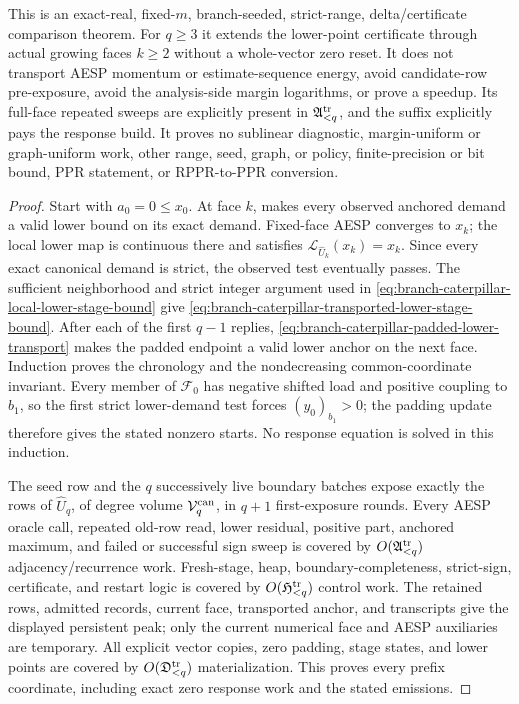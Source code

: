 \begin{theorem}
This is an exact-real, fixed-$m$, branch-seeded, strict-range,
delta/certificate comparison theorem.  For $q\geq3$ it extends the
lower-point certificate through actual growing faces $k\geq2$ without a
whole-vector zero reset.  It does not transport AESP momentum or
estimate-sequence energy, avoid candidate-row pre-exposure, avoid the
analysis-side margin logarithms, or prove a speedup.  Its full-face repeated
sweeps are explicitly present in $\mathfrak A_{<q}^{\rm tr}$, and the suffix
explicitly pays the response build.  It proves no sublinear diagnostic,
margin-uniform or graph-uniform work, other range, seed, graph, or policy,
finite-precision or bit bound, PPR statement, or RPPR-to-PPR conversion.
\end{theorem}

\begin{proof}
Start with $a_0=0\leq x_0$.  At face $k$,
 makes every observed
anchored demand a valid lower bound on its exact demand.  Fixed-face AESP
converges to $x_k$; the local lower map is continuous there and satisfies
$\mathcal L_{\widehat U_k}(x_k)=x_k$.  Since every exact canonical demand is
strict, the observed test eventually passes.  The sufficient neighborhood
and strict integer argument used in
\cref{eq:branch-caterpillar-local-lower-stage-bound} give
\cref{eq:branch-caterpillar-transported-lower-stage-bound}.  After each of the
first $q-1$ replies,
\cref{eq:branch-caterpillar-padded-lower-transport} makes the padded endpoint
a valid lower anchor on the next face.  Induction proves the chronology and
the nondecreasing common-coordinate invariant.  Every member of
$\mathcal F_0$ has negative shifted load and positive coupling to $b_1$, so
the first strict lower-demand test forces $(y_0)_{b_1}>0$; the padding update
therefore gives the stated nonzero starts.  No response equation is solved in
this induction.

The seed row and the $q$ successively live boundary batches expose exactly
the rows of $\widehat U_q$, of degree volume
$\mathcal V_q^{\rm can}$, in $q+1$ first-exposure rounds.  Every AESP
oracle call, repeated old-row read, lower residual, positive part, anchored
maximum, and failed or successful sign sweep is covered by
$O(\mathfrak A_{<q}^{\rm tr})$ adjacency/recurrence work.  Fresh-stage,
heap, boundary-completeness, strict-sign, certificate, and restart logic is
covered by $O(\mathfrak H_{<q}^{\rm tr})$ control work.  The retained rows,
admitted records, current face, transported anchor, and transcripts give the
displayed persistent peak; only the current numerical face and AESP
auxiliaries are temporary.  All explicit vector copies, zero padding, stage
states, and lower points are covered by
$O(\mathfrak D_{<q}^{\rm tr})$ materialization.  This proves every prefix
coordinate, including exact zero response work and the stated emissions.


\end{proof}
